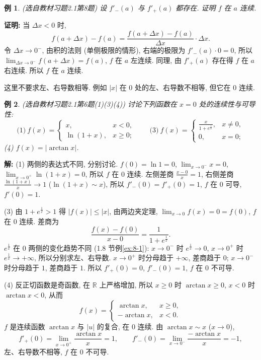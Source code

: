 \documentclass[UTF8,openany]{ctexbook}
\theoremstyle{chinesetextbook}
\newtheorem{example}{例}[section]
\newenvironment{cnproof}{\par\indent\textbf{证明:} \ignorespaces}{\par}
\newenvironment{cnsolution}{\par\indent\textbf{解:} \ignorespaces}{\par}
\begin{document}
\begin{example}\label{ex:c2-h1-8}
\textnormal{(选自教材习题2.1第8题)} 设 $f'_-(a)$ 与 $f'_+(a)$ 都存在. 证明 $f$ 在 $a$ 连续.
\end{example}
\begin{cnproof}
当 $\Delta x<0$ 时,
\[
f(a+\Delta x)-f(a)=\frac{f(a+\Delta x)-f(a)}{\Delta x}\cdot\Delta x.
\]
令 $\Delta x\to0^-$, 由积的法则 (单侧极限的情形), 右端的极限为 $f'_-(a)\cdot0=0$, 所以 $\displaystyle\lim_{\Delta x\to0^-}f(a+\Delta x)=f(a)$, $f$ 在 $a$ 左连续. 同理, 由 $f'_+(a)$ 存在得 $f$ 在 $a$ 右连续. 所以 $f$ 在 $a$ 连续.
\end{cnproof}
这里不要求左、右导数相等. 例如 $|x|$ 在 $0$ 处的左、右导数不相等, 但它在 $0$ 连续.
\begin{example}\label{ex:c2-h1-6}
\textnormal{(选自教材习题2.1第6题(1)(3)(4))} 讨论下列函数在 $x=0$ 处的连续性与可导性:
\[
\text{(1)}\ f(x)=\begin{cases}x,&x<0,\\\ln(1+x),&x\ge0;\end{cases}\qquad\text{(3)}\ f(x)=\begin{cases}\frac x{1+e^{\frac1x}},&x\ne0,\\0,&x=0;\end{cases}
\]
(4) $f(x)=|\arctan x|$.
\end{example}
\begin{cnsolution}
(1) 两侧的表达式不同, 分别讨论. $f(0)=\ln1=0$, $\displaystyle\lim_{x\to0^-}x=0$, $\displaystyle\lim_{x\to0^+}\ln(1+x)=0$, 所以 $f$ 在 $0$ 连续. 左侧差商 $\displaystyle\frac{x-0}x=1$, 右侧差商 $\displaystyle\frac{\ln(1+x)}x\to1$ ($\ln(1+x)\sim x$), 所以 $f'_-(0)=f'_+(0)=1$, $f$ 在 $0$ 可导, $f'(0)=1$.

(3) 由 $1+e^{\frac1x}>1$ 得 $|f(x)|\le|x|$, 由两边夹定理, $\displaystyle\lim_{x\to0}f(x)=0=f(0)$, $f$ 在 $0$ 连续. 差商为
\[
\frac{f(x)-f(0)}{x-0}=\frac1{1+e^{\frac1x}}.
\]
$e^{\frac1x}$ 在 $0$ 两侧的变化趋势不同 (1.8 节例\ref{ex:8-1}): $x\to0^-$ 时 $e^{\frac1x}\to0$, $x\to0^+$ 时 $e^{\frac1x}\to+\infty$, 所以分别求左、右导数. $x\to0^+$ 时分母趋于 $+\infty$, 差商趋于 $0$; $x\to0^-$ 时分母趋于 $1$, 差商趋于 $1$. 所以 $f'_+(0)=0$, $f'_-(0)=1$, $f$ 在 $0$ 不可导.

(4) 反正切函数是奇函数, 在 $\mathbb R$ 上严格增加, 所以 $x\ge0$ 时 $\arctan x\ge0$, $x<0$ 时 $\arctan x<0$, 从而
\[
f(x)=\begin{cases}\arctan x,&x\ge0,\\-\arctan x,&x<0.\end{cases}
\]
$f$ 是连续函数 $\arctan x$ 与 $|u|$ 的复合, 在 $0$ 连续. 由 $\arctan x\sim x$ ($x\to0$),
\[
f'_+(0)=\lim_{x\to0^+}\frac{\arctan x}x=1,\qquad f'_-(0)=\lim_{x\to0^-}\frac{-\arctan x}x=-1,
\]
左、右导数不相等, $f$ 在 $0$ 不可导.
\end{cnsolution}
\end{document}
